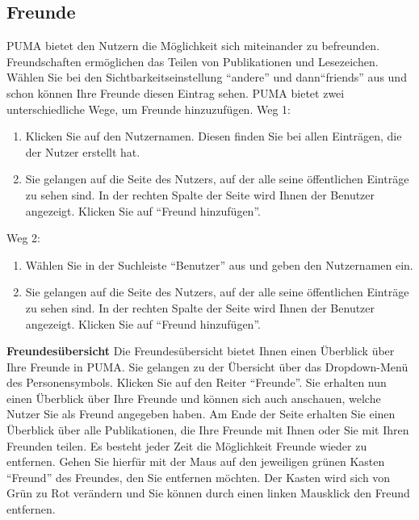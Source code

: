 \documentclass[a4paper,11pt,twoside]{scrbook}
\begin{document}
\subsection{Freunde}%
PUMA bietet den Nutzern die Möglichkeit sich miteinander zu befreunden. Freundschaften ermöglichen das Teilen von Publikationen und Lesezeichen. Wählen Sie bei den Sichtbarkeitseinstellung \enquote{andere} und dann\enquote{friends} aus und schon können Ihre Freunde diesen Eintrag sehen.
PUMA bietet zwei unterschiedliche Wege, um Freunde hinzuzufügen.
\newline
Weg 1:
\begin{enumerate}
    \item Klicken Sie auf den Nutzernamen. Diesen finden Sie bei allen Einträgen, die der Nutzer erstellt hat.
    \item Sie gelangen auf die Seite des Nutzers, auf der alle seine öffentlichen Einträge zu sehen sind. In der rechten Spalte der Seite wird Ihnen der Benutzer angezeigt. Klicken Sie auf \enquote{Freund hinzufügen}.
\end{enumerate}
Weg 2:
\begin{enumerate}
    \item Wählen Sie in der Suchleiste \enquote{Benutzer} aus und geben den Nutzernamen ein.
    \item Sie gelangen auf die Seite des Nutzers, auf der alle seine öffentlichen Einträge zu sehen sind. In der rechten Spalte der Seite wird Ihnen der Benutzer angezeigt. Klicken Sie auf \enquote{Freund hinzufügen}.
\end{enumerate}
\textbf{Freundesübersicht} \newline
Die Freundesübersicht bietet Ihnen einen Überblick über Ihre Freunde in PUMA. Sie gelangen zu der Übersicht über das Dropdown-Menü des Personensymbols. Klicken Sie auf den Reiter \enquote{Freunde}. Sie erhalten nun einen Überblick über Ihre Freunde und können sich auch anschauen, welche Nutzer Sie als Freund angegeben haben. Am Ende der Seite erhalten Sie einen Überblick über alle Publikationen, die Ihre Freunde mit Ihnen oder Sie mit Ihren Freunden teilen.\newline
Es besteht jeder Zeit die Möglichkeit Freunde wieder zu entfernen. Gehen Sie hierfür mit der Maus auf den jeweiligen grünen Kasten \enquote{Freund} des Freundes, den Sie entfernen möchten. Der Kasten wird sich von Grün zu Rot verändern und Sie können durch einen linken Mausklick den Freund entfernen. 
\end{document}
